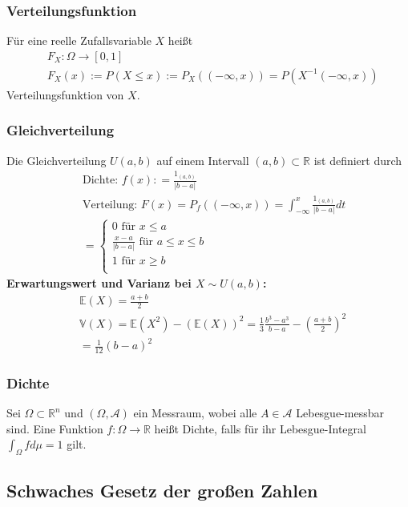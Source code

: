 \documentclass[a4paper]{article}
\begin{document}
\subsubsection{Verteilungsfunktion}
Für eine reelle Zufallsvariable $X$ heißt 
\begin{align*} 
& F_X : \Omega \to [0,1] \\
& F_X (x) := P (X \leq x) := P_X (( -\infty, x )) = P(X^{-1} (-\infty, x))
\end{align*}
Verteilungsfunktion von $X$.

\subsubsection{Gleichverteilung}
Die Gleichverteilung $U{(a,b)}$ auf einem Intervall $(a,b) \subset \mathbb{R}$ ist definiert durch
\begin{align*}
& \text{Dichte: } f (x) : = \frac{1_{(a,b)}}{|b-a| } \\
& \text{Verteilung: } F (x) =  P_f( (-\infty, x))  =  \int_{-\infty}^{x} \frac{1_{(a,b)}}{|b-a|} dt\\\
& = \begin {cases} 0 \text{ für } x \leq a \\   \frac{x-a}{|b-a|} \text{ für } a \leq x \leq b \\ 1 \text{ für }  x \geq b \\  \end{cases}
\end{align*}
\textbf{Erwartungswert und Varianz bei $X \sim U(a,b)$:}
\begin{align*}
& \mathbb{E}(X) = \frac{a+b}2 \\
& \mathbb{V}(X) = \mathbb{E}(X^2) - \left({\mathbb{E}(X)} \right)^2  = \frac{1}{3}\frac{b^3  - a^3}{b - a} - \left( {\frac{a + b}{2}} \right)^2 \\
    &= \frac{1}{12}(b - a)^2
\end{align*}

\subsubsection{Dichte}
Sei $\Omega \subset \mathbb{R}^n$ und $(\Omega, \mathcal{A})$ ein Messraum, wobei alle $A \in \mathcal{A}$ Lebesgue-messbar sind.
 Eine Funktion $f: \Omega \to \mathbb{R}$ heißt Dichte, falls für ihr Lebesgue-Integral $\int_{\Omega} f d \mu = 1$ gilt.


\subsection{Schwaches Gesetz der großen Zahlen}
\end{document}
